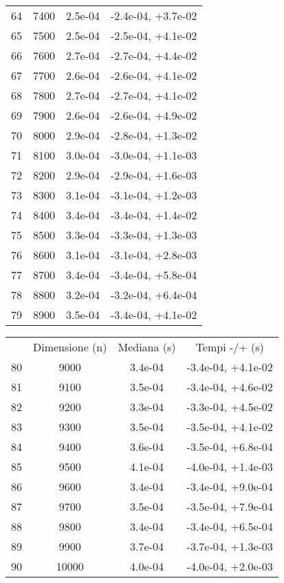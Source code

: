 \begin{table}
\begin{adjustbox}{width=1\textwidth/2}
\begin{tabular}{|c|c|c|c|}
\cline{1-4}
64 & 7400 & 2.5e-04 & -2.4e-04, +3.7e-02 \\
\cline{1-4}
65 & 7500 & 2.5e-04 & -2.5e-04, +4.1e-02 \\
\cline{1-4}
66 & 7600 & 2.7e-04 & -2.7e-04, +4.4e-02 \\
\cline{1-4}
67 & 7700 & 2.6e-04 & -2.6e-04, +4.1e-02 \\
\cline{1-4}
68 & 7800 & 2.7e-04 & -2.7e-04, +4.1e-02 \\
\cline{1-4}
69 & 7900 & 2.6e-04 & -2.6e-04, +4.9e-02 \\
\cline{1-4}
70 & 8000 & 2.9e-04 & -2.8e-04, +1.3e-02 \\
\cline{1-4}
71 & 8100 & 3.0e-04 & -3.0e-04, +1.1e-03 \\
\cline{1-4}
72 & 8200 & 2.9e-04 & -2.9e-04, +1.6e-03 \\
\cline{1-4}
73 & 8300 & 3.1e-04 & -3.1e-04, +1.2e-03 \\
\cline{1-4}
74 & 8400 & 3.4e-04 & -3.4e-04, +1.4e-02 \\
\cline{1-4}
75 & 8500 & 3.3e-04 & -3.3e-04, +1.3e-03 \\
\cline{1-4}
76 & 8600 & 3.1e-04 & -3.1e-04, +2.8e-03 \\
\cline{1-4}
77 & 8700 & 3.4e-04 & -3.4e-04, +5.8e-04 \\
\cline{1-4}
78 & 8800 & 3.2e-04 & -3.2e-04, +6.4e-04 \\
\cline{1-4}
79 & 8900 & 3.5e-04 & -3.4e-04, +4.1e-02 \\
\cline{1-4}
\end{tabular}
\end{adjustbox}
\end{table}

\begin{table}
\centering
\begin{adjustbox}{width=1\textwidth/2}
\begin{tabular}{|c|c|c|c|}
\hline
 & Dimensione (n) & Mediana (s) & Tempi -/+ (s) \\
80 & 9000 & 3.4e-04 & -3.4e-04, +4.1e-02 \\
\cline{1-4}
81 & 9100 & 3.5e-04 & -3.4e-04, +4.6e-02 \\
\cline{1-4}
82 & 9200 & 3.3e-04 & -3.3e-04, +4.5e-02 \\
\cline{1-4}
83 & 9300 & 3.5e-04 & -3.5e-04, +4.1e-02 \\
\cline{1-4}
84 & 9400 & 3.6e-04 & -3.5e-04, +6.8e-04 \\
\cline{1-4}
85 & 9500 & 4.1e-04 & -4.0e-04, +1.4e-03 \\
\cline{1-4}
86 & 9600 & 3.4e-04 & -3.4e-04, +9.0e-04 \\
\cline{1-4}
87 & 9700 & 3.5e-04 & -3.5e-04, +7.9e-04 \\
\cline{1-4}
88 & 9800 & 3.4e-04 & -3.4e-04, +6.5e-04 \\
\cline{1-4}
89 & 9900 & 3.7e-04 & -3.7e-04, +1.3e-03 \\
\cline{1-4}
90 & 10000 & 4.0e-04 & -4.0e-04, +2.0e-03 \\
\cline{1-4}
\end{tabular}
\end{adjustbox}
\end{table}

